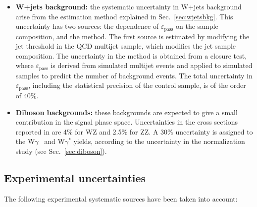 \begin{itemize}
\item {\bf\boldmath W+jets background:} 
the systematic uncertainty in W+jets background arise from the estimation method explained in Sec.~\ref{sec:wjetsbkg}. This uncertainty has two sources: the dependence of $\varepsilon_\mathrm{pass}$ on the sample composition, and the method. The first source is estimated by modifying the jet \pt threshold in the QCD multijet sample, which modifies the jet sample composition.  The uncertainty in the method is obtained from a closure test, where $\varepsilon_\mathrm{pass}$ is derived from simulated multijet events and applied to simulated samples to predict the number of background events. The total uncertainty in $\varepsilon_\mathrm{pass}$, including the statistical precision of the control sample, is of the order of 40\%.
 
\item {\bf\boldmath Diboson backgrounds:} 
these backgrounds are expected to give a small contribution in the signal phase space. Uncertainties in the cross sections reported in \cite{xsecSM,bib:ellis} are 4\% for WZ and 2.5\% for ZZ. A 30\% uncertainty is assigned to the W$\gamma$~\cite{WgammaXsec} and W$\gamma^{*}$ yields, according to the uncertainty in the normalization study (see Sec.~\ref{sec:diboson}).
      
\end{itemize}

\subsection{Experimental uncertainties \label{subsec:expsyst}}

The following experimental systematic sources have been taken into account:

